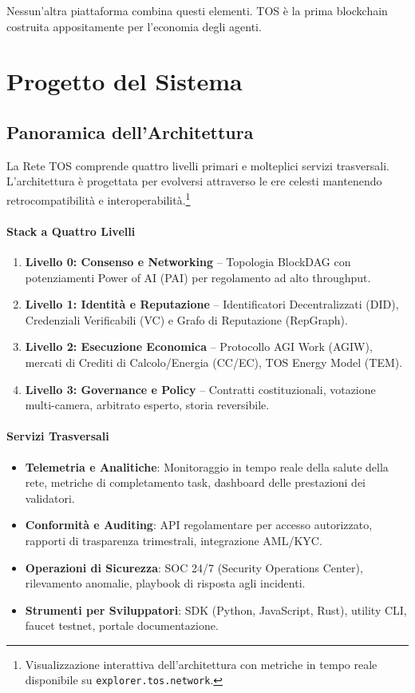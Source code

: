 \documentclass[11pt]{article}
\begin{document}
Nessun'altra piattaforma combina questi elementi. TOS è la prima blockchain costruita appositamente per l'economia degli agenti.

\section{Progetto del Sistema}
\subsection{Panoramica dell'Architettura}
La Rete TOS comprende quattro livelli primari e molteplici servizi trasversali. L'architettura è progettata per evolversi attraverso le ere celesti mantenendo retrocompatibilità e interoperabilità.\footnote{Visualizzazione interattiva dell'architettura con metriche in tempo reale disponibile su \texttt{explorer.tos.network}.}

\paragraph{Stack a Quattro Livelli}
\begin{enumerate}[noitemsep]
  \item \textbf{Livello 0: Consenso e Networking} -- Topologia BlockDAG con potenziamenti Power of AI (PAI) per regolamento ad alto throughput.
  \item \textbf{Livello 1: Identità e Reputazione} -- Identificatori Decentralizzati (DID), Credenziali Verificabili (VC) e Grafo di Reputazione (RepGraph).
  \item \textbf{Livello 2: Esecuzione Economica} -- Protocollo AGI Work (AGIW), mercati di Crediti di Calcolo/Energia (CC/EC), TOS Energy Model (TEM).
  \item \textbf{Livello 3: Governance e Policy} -- Contratti costituzionali, votazione multi-camera, arbitrato esperto, storia reversibile.
\end{enumerate}

\paragraph{Servizi Trasversali}
\begin{itemize}[noitemsep]
  \item \textbf{Telemetria e Analitiche}: Monitoraggio in tempo reale della salute della rete, metriche di completamento task, dashboard delle prestazioni dei validatori.
  \item \textbf{Conformità e Auditing}: API regolamentare per accesso autorizzato, rapporti di trasparenza trimestrali, integrazione AML/KYC.
  \item \textbf{Operazioni di Sicurezza}: SOC 24/7 (Security Operations Center), rilevamento anomalie, playbook di risposta agli incidenti.
  \item \textbf{Strumenti per Sviluppatori}: SDK (Python, JavaScript, Rust), utility CLI, faucet testnet, portale documentazione.
\end{itemize}
\end{document}
